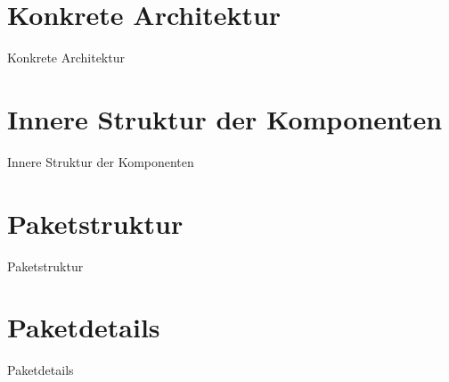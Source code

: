 \documentclass{beamer}
\begin{document}
	\section{Konkrete Architektur}
	\begin{frame}{Konkrete Architektur}

	\end{frame}
	\section{ Innere Struktur der Komponenten}
	\begin{frame}{Innere Struktur der Komponenten}

	\end{frame}
	\section{Paketstruktur}
	\begin{frame}{Paketstruktur}

	\end{frame}
	\section{Paketdetails}
	\begin{frame}{Paketdetails}

	\end{frame}

	\begin{frame}[title=Hauptgebaeude_Nacht.jpg]
		\maketitle
		\date{26. Mai 2018}
	\end{frame}
\end{document}

